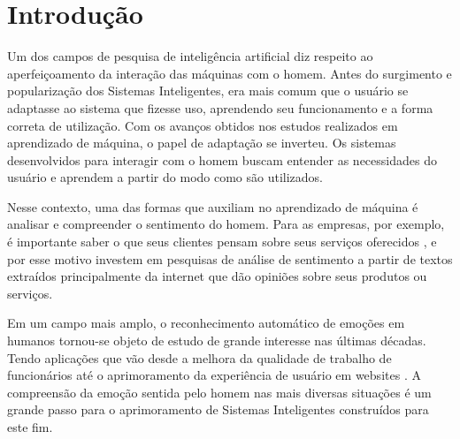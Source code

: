 \documentclass[
12pt,				%
openright,			%
oneside,			%
a4paper,			%
english,			%
french,				%
spanish,			%
brazil				%
]{abntex2}
\begin{document}


\tableofcontents*
\cleardoublepage


\textual



\chapter{Introdução} \label{introducao}
Um dos campos de pesquisa de inteligência artificial diz respeito ao aperfeiçoamento da interação das máquinas com o homem. Antes do surgimento e popularização dos Sistemas Inteligentes, era mais comum que o usuário se adaptasse ao sistema que fizesse uso, aprendendo seu funcionamento e a forma  correta de utilização. Com os avanços obtidos nos estudos realizados em aprendizado de máquina, o papel de adaptação se inverteu. Os sistemas desenvolvidos para interagir com o homem buscam entender as necessidades do usuário e aprendem a partir do modo como são utilizados. 

Nesse contexto, uma das formas que auxiliam no aprendizado de máquina é analisar e compreender o sentimento do homem. Para as empresas, por exemplo, é importante saber o que seus clientes pensam sobre seus serviços oferecidos \cite{pang2008opinion}, e por esse motivo investem em pesquisas de análise de sentimento a partir de textos extraídos principalmente da internet que dão opiniões sobre seus produtos ou serviços.

Em um campo mais amplo, o reconhecimento automático de emoções em humanos tornou-se objeto de estudo de grande interesse nas últimas décadas. Tendo aplicações que vão desde a melhora da qualidade de trabalho de funcionários até o aprimoramento da experiência de usuário em websites \cite{kolakowska2014emotion}. A compreensão da emoção sentida pelo homem nas mais diversas situações é um grande passo para o aprimoramento de Sistemas Inteligentes construídos para este fim.
\end{document}

